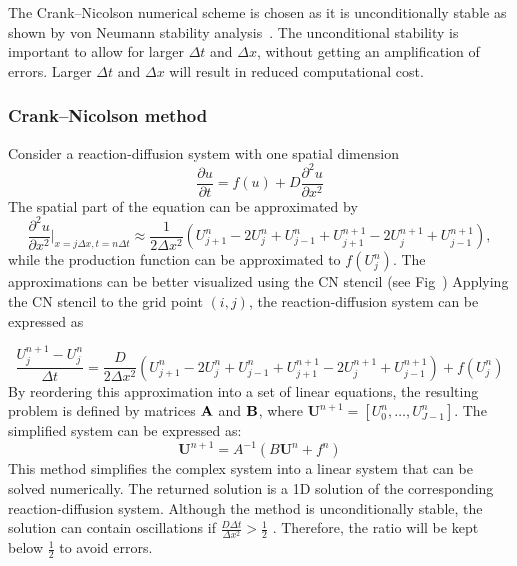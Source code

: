 \documentclass[10pt,letterpaper]{article}
\newcommand{\pdvn}[3]{\frac{\partial^{#1} {#2}}{\partial {#3}^{#1}}}
\begin{document}
The Crank–Nicolson numerical scheme is chosen as it is unconditionally stable as shown by von Neumann stability analysis~\parencite{strikwerda2004finite}.
The unconditional stability is important to allow for larger $\Delta t$ and $\Delta x$, without getting an amplification of errors. Larger $\Delta t$ and $\Delta x$ will result in reduced computational cost.


\subsubsection*{Crank–Nicolson method}\label{cranknicolson}
Consider a reaction-diffusion system with one spatial dimension
\begin{equation}
    \frac{\partial u}{\partial t} =  f(u) + D\pdvn{2}{u}{x}
\end{equation}
The spatial part of the equation can be approximated by
\begin{equation}
    \pdvn{2}{u}{x} \biggr\rvert_{x=j\Delta x,t=n\Delta t} \approx \frac{1}{2\Delta x^{2}}\left( U^{n}_{j+1} -  2U^{n}_{j} + U^{n}_{j-1} + U^{n+1}_{j+1} - 2U^{n+1}_{j} + U^{n+1}_{j-1}\right),
\end{equation}
while the production function can be approximated to $f ( U^{n}_{j})$. The approximations can be better visualized using the CN stencil (see Fig~)
Applying the CN stencil to the grid point $(i, j)$, the reaction-diffusion system can be expressed as

\begin{equation}
    \frac{U^{n+1}_{j} - U^{n}_{j}}{\Delta t} = \frac{D}{2\Delta x^{2}}\left( U^{n}_{j+1} -  2U^{n}_{j} + U^{n}_{j-1} + U^{n+1}_{j+1} - 2U^{n+1}_{j} + U^{n+1}_{j-1}\right) +  f( U^{n}_{j})
    \label{CN_stencil}
\end{equation}
By reordering this approximation into a set of linear equations, the resulting problem is defined by matrices $\bf A$ and $\bf B$, where $\textbf{U}^{n+1} = [U^{n}_{0}, \ldots , U^{n}_{J-1}]$. The simplified system can be expressed as:
\begin{equation}
    \textbf{U}^{n+1} = A^{-1}(B\textbf{U}^{n} + f^{n})
\end{equation}
This method simplifies the complex system into a linear system that can be solved numerically. The returned solution is a 1D solution of the corresponding reaction-diffusion system. Although the method is unconditionally stable, the solution can contain oscillations if $ \frac{D\Delta t}{\Delta x^{2}} >\frac{1}{2} $ \parencite{trefethen1996finite}. Therefore, the ratio will be kept below $\frac{1}{2}$ to avoid errors.
\end{document}
